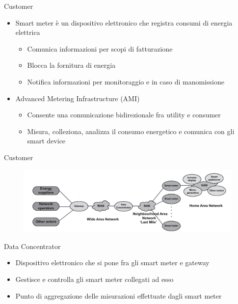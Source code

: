 \begin{frame}[fragile]{Customer} 
	\begin{itemize}[<+- | alert@+>]
		\item Smart meter è un dispositivo elettronico che registra consumi di energia elettrica
		\begin{itemize}
			\item Comunica informazioni per scopi di fatturazione
			\item Blocca la fornitura di energia  %
			\item Notifica informazioni per monitoraggio e in caso di manomissione %
		\end{itemize}		 
		\item Advanced Metering Infrastructure  (AMI)%
		\begin{itemize}
			\item Consente una comunicazione bidirezionale fra utility e consumer %
			\item Misura, colleziona, analizza il consumo energetico e comunica con gli smart device
		\end{itemize}			
	\end{itemize}
\end{frame}

\begin{frame}[fragile]{Customer} 
	\vspace{-20pt}
	\begin{figure}[h] 
		\includegraphics[scale=0.35]{imgs/smcom2.png}
	\end{figure}
	\begin{block}{Data Concentrator}
		\begin{itemize}[<+- | alert@+>]
			\item Dispositivo elettronico che si pone fra gli smart meter e gateway
			\item Gestisce e controlla gli smart meter collegati ad esso
			\item Punto di aggregazione delle misurazioni effettuate dagli smart meter
		\end{itemize}
	\end{block}
\end{frame}

